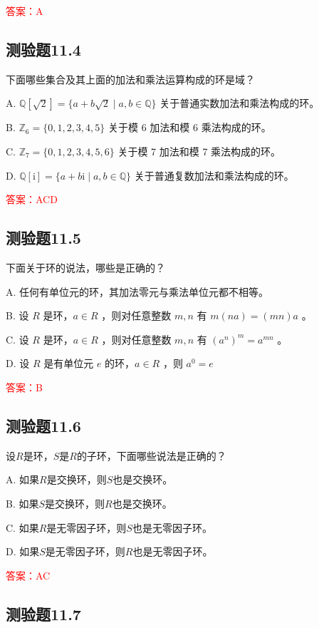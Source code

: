 \documentclass[UTF8, heading=true]{ctexart}
\begin{document}
\textcolor{red}{答案：A}

\subsection{测验题11.4}

下面哪些集合及其上面的加法和乘法运算构成的环是域？

A.  $\mathbb{Q}[\sqrt{2}]=\{a+b \sqrt{2} \mid a, b \in \mathbb{Q}\}$ 关于普通实数加法和乘法构成的环。

B.  $\mathbb{Z}_6=\{0,1,2,3,4,5\}$ 关于模 6 加法和模 6 乘法构成的环。

C.  $\mathbb{Z}_7=\{0,1,2,3,4,5,6\}$ 关于模 7 加法和模 7 乘法构成的环。

D.  $\mathbb{Q}[\mathrm{i}]=\{a+b \mathrm{i} \mid a, b \in \mathbb{Q}\}$ 关于普通复数加法和乘法构成的环。


\textcolor{red}{答案：ACD}

\subsection{测验题11.5}

下面关于环的说法，哪些是正确的？

A. 任何有单位元的环，其加法零元与乘法单位元都不相等。

B. 设 $R$ 是环，$a \in R$ ，则对任意整数 $m, n$ 有 $m(n a)=(m n) a$ 。

C. 设 $R$ 是环，$a \in R$ ，则对任意整数 $m, n$ 有 $\left(a^n\right)^m=a^{m n}$ 。

D. 设 $R$ 是有单位元 $e$ 的环，$a \in R$ ，则 $a^0=e$

\textcolor{red}{答案：B}

\subsection{测验题11.6}

设$R$是环，$S$是$R$的子环，下面哪些说法是正确的？

A. 如果$R$是交换环，则$S$也是交换环。

B. 如果$S$是交换环，则$R$也是交换环。

C. 如果$R$是无零因子环，则$S$也是无零因子环。

D. 如果$S$是无零因子环，则$R$也是无零因子环。

\textcolor{red}{答案：AC}

\subsection{测验题11.7}
\end{document}
